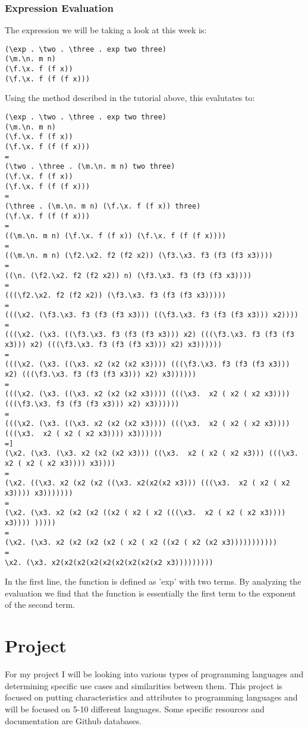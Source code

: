 \documentclass{article}
\theoremstyle{theorem}
\theoremstyle{definition}
\theoremstyle{remark}
\begin{document}
\subsubsection{Expression Evaluation}
The expression we will be taking a look at this week is:
\begin{lstlisting}
(\exp . \two . \three . exp two three)
(\m.\n. m n)
(\f.\x. f (f x))
(\f.\x. f (f (f x)))
\end{lstlisting}
Using the method described in the tutorial above, this evalutates to:
\begin{lstlisting}
(\exp . \two . \three . exp two three)
(\m.\n. m n)
(\f.\x. f (f x))
(\f.\x. f (f (f x)))
=
(\two . \three . (\m.\n. m n) two three)
(\f.\x. f (f x))
(\f.\x. f (f (f x)))
=
(\three . (\m.\n. m n) (\f.\x. f (f x)) three)
(\f.\x. f (f (f x)))
= 
((\m.\n. m n) (\f.\x. f (f x)) (\f.\x. f (f (f x))))
=
((\m.\n. m n) (\f2.\x2. f2 (f2 x2)) (\f3.\x3. f3 (f3 (f3 x3))))
=
((\n. (\f2.\x2. f2 (f2 x2)) n) (\f3.\x3. f3 (f3 (f3 x3))))
=
(((\f2.\x2. f2 (f2 x2)) (\f3.\x3. f3 (f3 (f3 x3)))))
=
(((\x2. (\f3.\x3. f3 (f3 (f3 x3))) ((\f3.\x3. f3 (f3 (f3 x3))) x2))))
=
(((\x2. (\x3. ((\f3.\x3. f3 (f3 (f3 x3))) x2) (((\f3.\x3. f3 (f3 (f3 x3))) x2) (((\f3.\x3. f3 (f3 (f3 x3))) x2) x3))))))
=
(((\x2. (\x3. ((\x3. x2 (x2 (x2 x3)))) (((\f3.\x3. f3 (f3 (f3 x3))) x2) (((\f3.\x3. f3 (f3 (f3 x3))) x2) x3))))))
=
(((\x2. (\x3. ((\x3. x2 (x2 (x2 x3)))) (((\x3.  x2 ( x2 ( x2 x3)))) (((\f3.\x3. f3 (f3 (f3 x3))) x2) x3))))))
=
(((\x2. (\x3. ((\x3. x2 (x2 (x2 x3)))) (((\x3.  x2 ( x2 ( x2 x3)))) (((\x3.  x2 ( x2 ( x2 x3)))) x3))))))
=]
(\x2. (\x3. (\x3. x2 (x2 (x2 x3))) ((\x3.  x2 ( x2 ( x2 x3))) (((\x3.  x2 ( x2 ( x2 x3)))) x3))))
=
(\x2. ((\x3. x2 (x2 (x2 ((\x3. x2(x2(x2 x3))) (((\x3.  x2 ( x2 ( x2 x3)))) x3)))))))
=
(\x2. (\x3. x2 (x2 (x2 ((x2 ( x2 ( x2 (((\x3.  x2 ( x2 ( x2 x3)))) x3)))) )))))
=
(\x2. (\x3. x2 (x2 (x2 (x2 ( x2 ( x2 ((x2 ( x2 (x2 x3)))))))))))
=
\x2. (\x3. x2(x2(x2(x2(x2(x2(x2(x2(x2 x3)))))))))
\end{lstlisting}
In the first line, the function is defined as 'exp' with two terms. By analyzing the evaluation we find that the function is essentially the first term to the exponent of the second term.
\section{Project}

For my project I will be looking into various types of programming languages and determining specific use cases and similarities between them. This project is focused on putting characteristics and attributes to programming languages and will be focused on 5-10 different languages. Some specific resources and documentation are Github databases.
\end{document}
